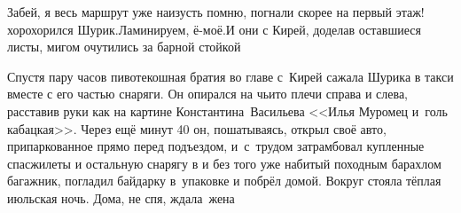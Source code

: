 \diagdash Забей, я весь маршрут уже наизусть помню, погнали скорее на первый этаж!\mdash хорохорился Шурик.\mdash Ламинируем, ё-моё.\mdash И они с Кирей, доделав оставшиеся листы, мигом очутились за барной стойкой\myldots{}  %


\myldots{}Спустя пару часов пивотекошная братия во главе с~Кирей сажала Шурика в такси вместе с его частью снаряги. Он опирался на чьи\sdash то плечи справа и слева, расставив руки как на картине Константина~Васильева <<Илья Муромец и~голь кабацкая>>. Через ещё минут 40 он, пошатываясь, открыл своё авто, припаркованное прямо перед подъездом, и~с~трудом затрамбовал купленные спасжилеты и остальную снарягу в и без того уже набитый походным барахлом багажник, погладил байдарку в~упаковке и побрёл домой. Вокруг стояла тёплая июльская ночь. Дома, не спя, ждала~жена\myldots{}

\begin{center}
\end{center}
